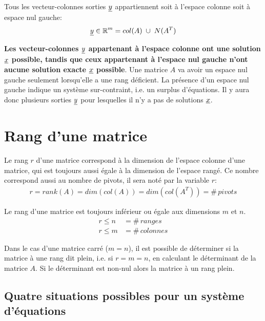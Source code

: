 Tous les vecteur-colonnes sorties $\underline{y}$ appartiennent soit à l'espace colonne soit à espace nul gauche:
\begin{align}
\col{y} \in \re^m = col(A) \; \cup \; N(A^T) %
\end{align}

\textbf{Les vecteur-colonnes $\underline{y}$ appartenant à l'espace colonne ont une solution $\underline{x}$ possible, tandis que ceux appartenant à l'espace nul gauche n'ont aucune solution exacte $\underline{x}$ possible}.
%
Une matrice $A$ va avoir un espace nul gauche seulement lorsqu'elle a une rang déficient. La présence d'un espace nul gauche indique un système sur-contraint, i.e. un surplus d'équations. Il y aura donc plusieurs sorties $\underline{y}$ pour lesquelles il n'y a pas de solutions $\underline{x}$.


\newpage
\section{Rang d'une matrice}
\label{sec:rang}

Le rang $r$ d'une matrice correspond à la dimension de l'espace colonne d'une matrice, qui est toujours aussi égale à la dimension de l'espace rangé. Ce nombre correspond aussi au nombre de pivots, il sera noté par la variable $r$:
\begin{align}
r = rank( A ) = dim( col(A) ) = dim( col(A^T) ) =\#\, pivots
\end{align}


Le rang d'une matrice est toujours inférieur ou égale aux dimensions $m$ et $n$.
\begin{align}
r \leq n &= \#\, ranges \\
r \leq m &= \#\, colonnes
\end{align}

Dans le cas d'une matrice carré ($m=n$), il est possible de déterminer si la matrice à une rang dit plein, i.e. si $r=m=n$, en calculant le déterminant de la matrice $A$. Si le déterminant est non-nul alors la matrice à un rang plein.  


\newpage
\subsection{Quatre situations possibles pour un système d'équations}
\label{sec:rangpleinvstrop}

